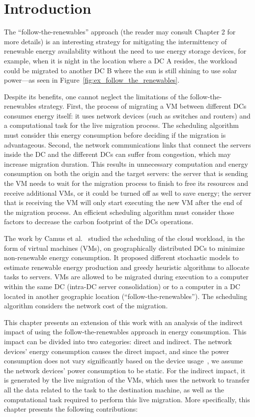\section{Introduction}

The ``follow-the-renewables'' approach (the reader may consult Chapter 2 for more details) is an interesting strategy for mitigating the intermittency of renewable energy availability without the need to use energy storage devices, for example, when it is night in the location where a DC A resides, the workload could be migrated to another DC B where the sun is still shining to use solar power---as seen in Figure~\ref{fig:ex_follow_the_renewables}.

Despite its benefits, one cannot neglect the limitations of the follow-the-renewables strategy. First, the process of migrating a VM between different DCs consumes energy itself: it uses network devices (such as switches and routers) and a computational task for the live migration process. The scheduling algorithm must consider this energy consumption before deciding if the migration is advantageous. Second, the network communications links that connect the servers inside the DC and the different DCs can suffer from congestion, which may increase migration duration. This results in unnecessary computation and energy consumption on both the origin and the target servers: the server that is sending the VM needs to wait for the migration process to finish to free its resources and receive additional VMs, or it could be turned off as well to save energy; the server that is receiving the VM will only start executing the new VM after the end of the migration process. An efficient scheduling algorithm must consider those factors to decrease the carbon footprint of the DCs operations.


The work by Camus et al.~\citet{NEMESIS,SAGITTA} studied the scheduling of the cloud workload, in the form of virtual machines (VMs), on geographically distributed DCs to minimize non-renewable energy consumption. It proposed different stochastic models to estimate renewable energy production and greedy heuristic algorithms to allocate tasks to servers. VMs are allowed to be migrated during execution to a computer within the same DC (intra-DC server consolidation)  or to a computer in a DC located in another geographic location (``follow-the-renewables''). The scheduling algorithm considers the network cost of the migration.


This chapter presents an extension of this work with an analysis of the indirect impact of using the follow-the-renewables approach in energy consumption. This impact can be divided into two categories: direct and indirect. The network devices' energy consumption causes the direct impact, and since the power consumption does not vary significantly based on the device usage~\cite{energy_network_devices}, we assume the network devices' power consumption to be static. For the indirect impact, it is generated by the live migration of the VMs, which uses the network to transfer all the data related to the task to the destination machine, as well as the computational task required to perform this live migration. More specifically, this chapter presents the following contributions:


